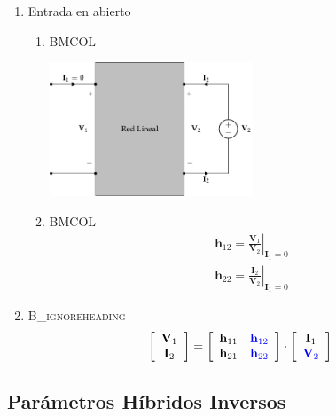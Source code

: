 \begin{enumerate}
\item Entrada en abierto
\label{sec:orgc4ee659}

\begin{enumerate}
\item \hfill{}\textsc{BMCOL}
\label{sec:org4eea1be}
\begin{center}
\includegraphics[height=4cm]{../figs/parametrosH_salida.pdf}
\end{center}

\item \hfill{}\textsc{BMCOL}
\label{sec:org3452f57}
\renewcommand{\arraystretch}{2}
\[
  \begin{array}{c}
    \mathbf{h}_{12} = \left.\frac{\mathbf{V}_1}{\mathbf{V}_2}\right\rvert_{\mathbf{I}_1 = 0}\\
    \mathbf{h}_{22} = \left.\frac{\mathbf{I}_2}{\mathbf{V}_2}\right\rvert_{\mathbf{I}_1 = 0}
  \end{array}
\]
\end{enumerate}

\item \hfill{}\textsc{B\_ignoreheading}
\label{sec:org9431e69}
\[
  \left[
    \begin{array}{c}
      \mathbf{V}_1\\
      \mathbf{I}_2
    \end{array}
  \right] =
  \left[
    \begin{array}{cc}
      \mathbf{h}_{11} & \color{blue}{\mathbf{h}_{12}}\\
      \mathbf{h}_{21} & \color{blue}{\mathbf{h}_{22}}
    \end{array}
  \right] \cdot
  \left[
    \begin{array}{c}
      \mathbf{I}_1\\
      \color{blue}{\mathbf{V}_2}
    \end{array}
  \right]
\]
\end{enumerate}


\subsection{Parámetros Híbridos Inversos}
\label{sec:orgbbd88b6}

